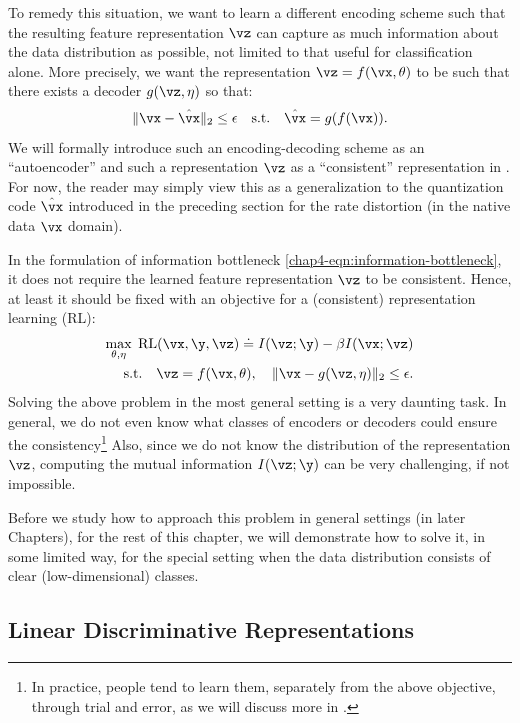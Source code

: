 \documentclass[../../book-main.tex]{subfiles}
\begin{document}
To remedy this situation, we want to learn a different encoding
scheme such that the resulting feature representation $\vz$ can
capture as much information about the data distribution as possible,
not limited to that useful for classification alone. More precisely,
we want the representation $\vz = f(\vx, \theta)$ to be such that there
exists a decoder $g(\vz,\eta)$ so that:
\begin{equation}
    \|\vx - \hat \vx\|_2 \le \epsilon \quad \text{s.t.} \quad \hat{\vx}
    = g(f(\vx)).
\end{equation}
We will formally introduce such an encoding-decoding scheme as an
``autoencoder'' and such a representation $\vz$ as a ``consistent''
representation  in . For
now, the reader
may simply view this as a generalization to the quantization code
$\hat \vx$ introduced in the preceding section for the rate distortion
(in the native data $\vx$ domain).

In the formulation of information bottleneck
\eqref{chap4-eqn:information-bottleneck}, it does not require the
learned feature representation $\vz$ to be consistent. Hence, at least
it should be fixed with an objective for a (consistent)
representation learning (RL):
\begin{eqnarray}
    \max_{\theta,\eta}\; \mbox{RL}(\vx, \y, \vz) \doteq I(\vz; \y) - \beta
    I(\vx; \vz) \nonumber \\ \mathrm{s.t.}\quad  \vz = f(\vx,\theta),\quad
    \|\vx - g(\vz, \eta) \|_2 \le \epsilon.
    \label{chap4-eqn:representation-learning}
\end{eqnarray}
Solving the above problem in the most general setting is a very
daunting task. In general, we do not even know what classes of
encoders or decoders could ensure the consistency\footnote{In
    practice, people tend to learn them, separately from the above
    objective, through trial and error, as we will discuss more in
.} Also, since we do not know the
distribution of the representation $\vz$, computing the mutual
information $I(\vz;\y)$ can be very challenging, if not impossible.

Before we study how to approach this problem in general settings (in
later Chapters), for the rest of this chapter, we will demonstrate
how to solve it, in some limited way, for the special setting when
the data distribution consists of clear (low-dimensional) classes.

\subsection{Linear Discriminative Representations}\label{subsec:LDR}
\end{document}
